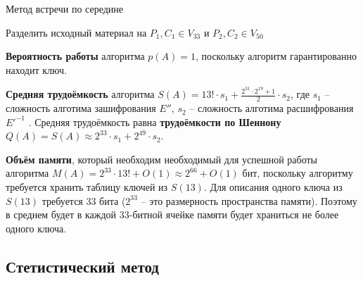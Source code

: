 \documentclass[a4paper,12pt]{article}
\theoremstyle{definition}
\begin{document}
	\begin{algorithm}[H]
		
		\caption{Метод встречи по середине}
		\label{alg:Midle}
		\SetAlgoNoEnd
		
		
		Разделить исходный материал на $P_1, C_1 \in V_{33}$ и $P_2, C_2 \in V_{50}$
		

	
	\end{algorithm}	
	
	
	\textbf{Вероятность работы} алгоритма $p(A)=1$, поскольку алгоритм гарантированно находит ключ. 
	
	\textbf{Средняя трудоёмкость} алгоритма $S(A)= 13! \cdot s_1 + \frac{2^{31} \cdot 2^{19} + 1}{2} \cdot s_2 $, где $s_1$ -- сложность алготима зашифрования $E''$, $s_2$ -- сложность алготима расшифрования $E'^{-1}$ . Средняя трудоёмкость равна \textbf{трудоёмкости по Шеннону} $Q(A) = S(A) \approx 2^{33} \cdot s_1 + 2^{49} \cdot s_2$.
	
	\textbf{Объём памяти}, который необходим необходимый для успешной работы алгоритма $M(A) = 2^{33} \cdot 13! + O(1) \approx 2^{66} + O(1)$ бит, поскольку алгоритму требуется хранить таблицу ключей из $S(13)$. Для описания одного ключа из $S(13)$ требуется 33 бита ($2^{33}$ -- это размерность пространства памяти). Поэтому в среднем будет в каждой 33-битной ячейке памяти будет храниться не более одного ключа. 
	

	\subsection{Стетистический метод}
	
\end{document}
